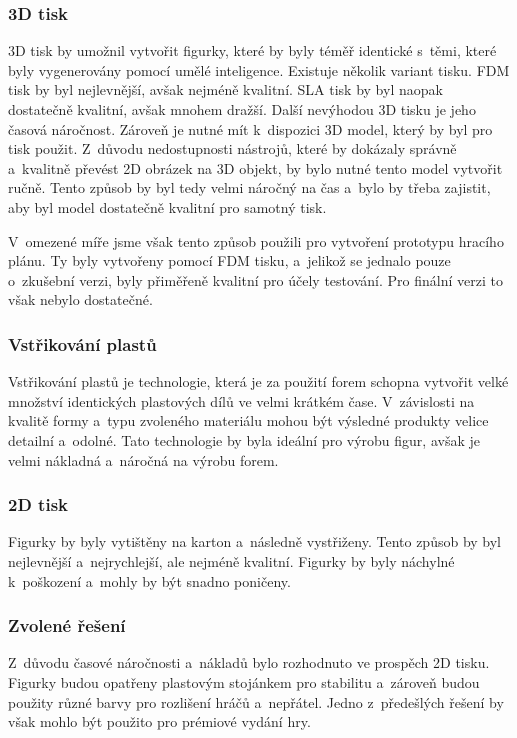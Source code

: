 \subsubsection*{3D tisk}
3D tisk by umožnil vytvořit figurky, které by byly téměř identické s~těmi, které byly vygenerovány pomocí umělé inteligence. Existuje několik variant tisku. FDM tisk by byl nejlevnější, avšak nejméně kvalitní. SLA tisk by byl naopak dostatečně kvalitní, avšak mnohem dražší. Další nevýhodou 3D tisku je jeho časová náročnost. Zároveň je nutné mít k~dispozici 3D model, který by byl pro tisk použit. Z~důvodu nedostupnosti nástrojů, které by dokázaly správně a~kvalitně převést 2D obrázek na 3D objekt, by bylo nutné tento model vytvořit ručně. Tento způsob by byl tedy velmi náročný na čas a~bylo by třeba zajistit, aby byl model dostatečně kvalitní pro samotný tisk.

V~omezené míře jsme však tento způsob použili pro vytvoření prototypu hracího plánu. Ty byly vytvořeny pomocí FDM tisku, a~jelikož se jednalo pouze o~zkušební verzi, byly přiměřeně kvalitní pro účely testování. Pro finální verzi to však nebylo dostatečné.

\subsubsection*{Vstřikování plastů}
Vstřikování plastů je technologie, která je za použití forem schopna vytvořit velké množství identických plastových dílů ve velmi krátkém čase. V~závislosti na kvalitě formy a~typu zvoleného materiálu mohou být výsledné produkty velice detailní a~odolné. Tato technologie by byla ideální pro výrobu figur, avšak je velmi nákladná a~náročná na výrobu forem.

\subsubsection*{2D tisk}
Figurky by byly vytištěny na karton a~následně vystřiženy. Tento způsob by byl nejlevnější a~nejrychlejší, ale nejméně kvalitní. Figurky by byly náchylné k~poškození a~mohly by být snadno poničeny.

\subsubsection*{Zvolené řešení}
Z~důvodu časové náročnosti a~nákladů bylo rozhodnuto ve prospěch 2D tisku. Figurky budou opatřeny plastovým stojánkem pro stabilitu a~zároveň budou použity různé barvy pro rozlišení hráčů a~nepřátel. Jedno z~předešlých řešení by však mohlo být použito pro prémiové vydání hry.

